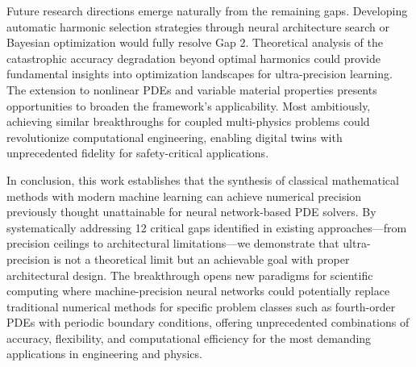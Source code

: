 Future research directions emerge naturally from the remaining gaps. Developing automatic harmonic selection strategies through neural architecture search or Bayesian optimization would fully resolve Gap 2. Theoretical analysis of the catastrophic accuracy degradation beyond optimal harmonics could provide fundamental insights into optimization landscapes for ultra-precision learning. The extension to nonlinear PDEs and variable material properties presents opportunities to broaden the framework's applicability. Most ambitiously, achieving similar breakthroughs for coupled multi-physics problems could revolutionize computational engineering, enabling digital twins with unprecedented fidelity for safety-critical applications.

In conclusion, this work establishes that the synthesis of classical mathematical methods with modern machine learning can achieve numerical precision previously thought unattainable for neural network-based PDE solvers. By systematically addressing 12 critical gaps identified in existing approaches—from precision ceilings to architectural limitations—we demonstrate that ultra-precision is not a theoretical limit but an achievable goal with proper architectural design. The breakthrough opens new paradigms for scientific computing where machine-precision neural networks could potentially replace traditional numerical methods for specific problem classes such as fourth-order PDEs with periodic boundary conditions, offering unprecedented combinations of accuracy, flexibility, and computational efficiency for the most demanding applications in engineering and physics.

